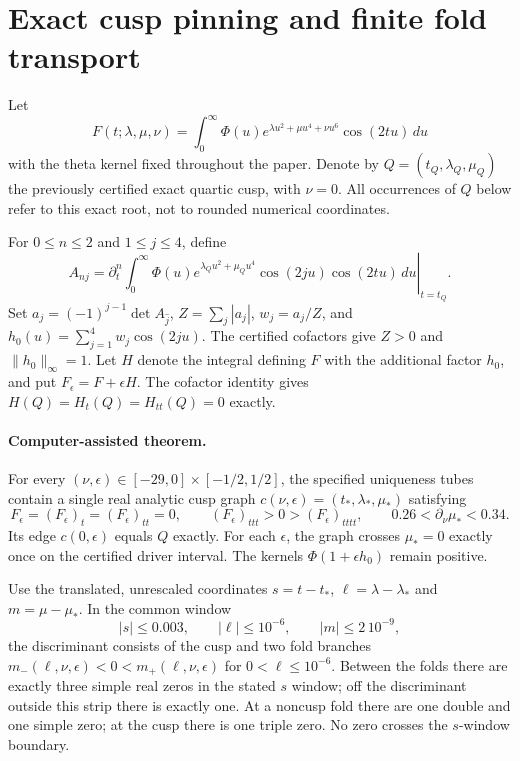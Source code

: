 \section{Exact cusp pinning and finite fold transport}

Let
\[
 F(t;\lambda,\mu,\nu)=\int_0^\infty\Phi(u)
 e^{\lambda u^2+\mu u^4+\nu u^6}\cos(2tu)\,du
\]
with the theta kernel fixed throughout the paper. Denote by
$Q=(t_Q,\lambda_Q,\mu_Q)$ the previously certified exact quartic cusp,
with $\nu=0$. All occurrences of $Q$ below refer to this exact root,
not to rounded numerical coordinates.

For $0\leq n\leq2$ and $1\leq j\leq4$, define
\[
 A_{nj}=\left.\partial_t^n\int_0^\infty\Phi(u)
 e^{\lambda_Q u^2+\mu_Q u^4}\cos(2ju)\cos(2tu)\,du
 \right|_{t=t_Q}.
\]
Set $a_j=(-1)^{j-1}\det A_{\widehat j}$,
$Z=\sum_j|a_j|$, $w_j=a_j/Z$, and
$h_0(u)=\sum_{j=1}^4w_j\cos(2ju)$.
The certified cofactors give $Z>0$ and $\|h_0\|_\infty=1$.
Let $H$ denote the integral defining $F$ with the additional factor
$h_0$, and put $F_\epsilon=F+\epsilon H$.
The cofactor identity gives $H(Q)=H_t(Q)=H_{tt}(Q)=0$ exactly.

\paragraph{Computer-assisted theorem.}
For every $(\nu,\epsilon)\in[-29,0]\times[-1/2,1/2]$, the specified
uniqueness tubes contain a single real analytic cusp graph
$c(\nu,\epsilon)=(t_*,\lambda_*,\mu_*)$ satisfying
\[
 F_\epsilon=(F_\epsilon)_t=(F_\epsilon)_{tt}=0,\qquad
 (F_\epsilon)_{ttt}>0>(F_\epsilon)_{tttt},\qquad
 0.26<\partial_\nu\mu_*<0.34.
\]
Its edge $c(0,\epsilon)$ equals $Q$ exactly. For each $\epsilon$,
the graph crosses $\mu_*=0$ exactly once on the certified driver
interval. The kernels $\Phi(1+\epsilon h_0)$ remain positive.

Use the translated, unrescaled coordinates
$s=t-t_*$, $\ell=\lambda-\lambda_*$ and $m=\mu-\mu_*$.
In the common window
\[
 |s|\leq0.003,\qquad |\ell|\leq10^{-6},\qquad |m|\leq2\,10^{-9},
\]
the discriminant consists of the cusp and two fold branches
$m_-(\ell,\nu,\epsilon)<0<m_+(\ell,\nu,\epsilon)$ for
$0<\ell\leq10^{-6}$. Between the folds there are exactly three
simple real zeros in the stated $s$ window; off the discriminant
outside this strip there is exactly one. At a noncusp fold there
are one double and one simple zero; at the cusp there is one
triple zero. No zero crosses the $s$-window boundary.

